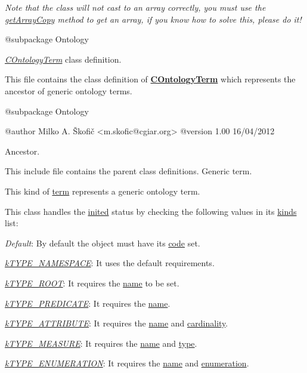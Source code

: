 {\itshape Note that the class will not cast to an array correctly, you must use the \hyperlink{}{get\-Array\-Copy} method to get an array, if you know how to solve this, please do it!}

\begin{DoxyVerb}    @subpackage     Ontology\end{DoxyVerb}


{\itshape \hyperlink{class_c_ontology_term}{C\-Ontology\-Term}} class definition.

This file contains the class definition of {\bfseries \hyperlink{class_c_ontology_term}{C\-Ontology\-Term}} which represents the ancestor of generic ontology terms.

\begin{DoxyVerb}    @subpackage     Ontology

    @author         Milko A. Škofič <m.skofic@cgiar.org>
    @version        1.00 16/04/2012\end{DoxyVerb}


Ancestor.

This include file contains the parent class definitions. Generic term.

This kind of \hyperlink{class_c_ontology_term_object}{term} represents a generic ontology term.

This class handles the \hyperlink{}{inited} status by checking the following values in its \hyperlink{}{kinds} list\-:


\begin{DoxyItemize}
\item {\itshape Default}\-: By default the object must have its \hyperlink{}{code} set. 
\item {\itshape \hyperlink{}{k\-T\-Y\-P\-E\-\_\-\-N\-A\-M\-E\-S\-P\-A\-C\-E}}\-: It uses the default requirements. 
\item {\itshape \hyperlink{}{k\-T\-Y\-P\-E\-\_\-\-R\-O\-O\-T}}\-: It requires the \hyperlink{}{name} to be set. 
\item {\itshape \hyperlink{}{k\-T\-Y\-P\-E\-\_\-\-P\-R\-E\-D\-I\-C\-A\-T\-E}}\-: It requires the \hyperlink{}{name}. 
\item {\itshape \hyperlink{}{k\-T\-Y\-P\-E\-\_\-\-A\-T\-T\-R\-I\-B\-U\-T\-E}}\-: It requires the \hyperlink{}{name} and \hyperlink{}{cardinality}. 
\item {\itshape \hyperlink{}{k\-T\-Y\-P\-E\-\_\-\-M\-E\-A\-S\-U\-R\-E}}\-: It requires the \hyperlink{}{name} and \hyperlink{}{type}. 
\item {\itshape \hyperlink{}{k\-T\-Y\-P\-E\-\_\-\-E\-N\-U\-M\-E\-R\-A\-T\-I\-O\-N}}\-: It requires the \hyperlink{}{name} and \hyperlink{}{enumeration}. 
\end{DoxyItemize}

